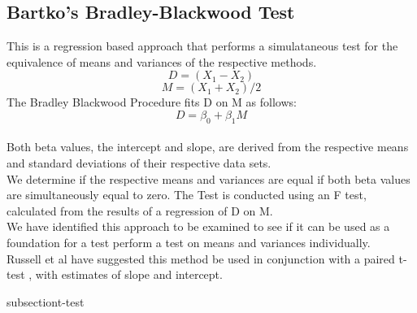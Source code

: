 \documentclass[12pt, a4paper]{article}
\begin{document}
\subsection{Bartko's Bradley-Blackwood Test}
This is a regression based approach that performs a simulataneous
test for the equivalence of means and variances of the respective
methods.\\
\begin{equation}
D = (X_{1}-X_{2})
\end{equation}
\begin{equation}
M = (X_{1} + X_{2}) /2
\end{equation}
The Bradley Blackwood Procedure fits D on M as follows:\\
\begin{equation}
D = \beta_{0} + \beta_{1}M
\end{equation}
\\Both beta values, the intercept and slope, are derived from the respective means and
standard deviations of their respective data sets.\\
We determine if the respective means and variances are equal if
both beta values are simultaneously equal to zero. The Test is
conducted using an F test, calculated from the results of a
regression of D on M.
\\We have identified this approach  to be examined to see if it can
be used as a foundation for a test perform a test on means and
variances individually.\\
Russell et al have suggested this method be used in conjunction
with a paired t-test , with estimates of slope and intercept.

subsection{t-test}
\end{document}
